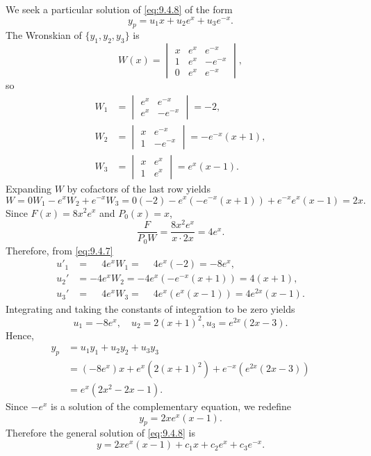 \begin{solution}
We seek a particular solution of \eqref{eq:9.4.8} of the form
\[
y_p=u_1x+u_2e^x+u_3e^{-x}.
\]
The Wronskian of  $\{y_1,y_2,y_3\}$ is
\[
W(x)=\begin{vmatrix}
x&e^x&e^{-x} \\ 1&e^x&-e^{-x} \\ 0&e^x&e^{-x}
\end{vmatrix},
\]
so
\begin{align*}
W_1
&=\begin{vmatrix}
e^x&e^{-x}\\ e^x&-e^{-x}
\end{vmatrix}=-2,\\
W_2
&=\begin{vmatrix}
x&e^{-x}\\1&-e^{-x}
\end{vmatrix}=-e^{-x}(x+1),\\
W_3
&=\begin{vmatrix}
x&e^x\\1&e^x
\end{vmatrix}=e^x(x-1).
\end{align*}
Expanding $W$ by cofactors of the last row yields
\[
W=0W_1-e^x W_2+e^{-x}W_3=0(-2)-e^x\left(-e^{-x}(x+1)\right)
+e^{-x}e^x(x-1)=2x.
\]
 Since $F(x)=8x^2e^x$ and $P_0(x)=x$,
\[
\frac{F}{P_0W}=\frac{8x^2e^x}{x\cdot 2x}=4e^x.
\]
Therefore, from \eqref{eq:9.4.7}
\begin{align*}
u'_1&=\phantom{-} 4e^xW_1=\phantom{-}4e^x(-2)=-8e^x,\\
u_2'&=-4e^xW_2=-4e^x\left(-e^{-x}(x+1)\right)=4(x+1),\\
u_3'&=\phantom{-}4e^xW_3=\phantom{-}4e^x\left(e^x(x-1)\right)=4e^{2x}(x-1).
\end{align*}
 Integrating and taking the constants of
integration to be zero yields
\[
u_1=-8e^x,\quad u_2=2(x+1)^2, u_3=e^{2x}(2x-3).
\]
Hence,
\begin{align*}
y_p&=u_1y_1+u_2y_2+u_3y_3\\
&=(-8e^x)x+e^x(2(x+1)^2)+e^{-x}\left(e^{2x}(2x-3)\right)\\
&=e^x(2x^2-2x-1).
\end{align*}
Since $-e^x$ is a solution of the complementary equation, we redefine
\[
y_p=2xe^x(x-1).
\]
 Therefore the general solution of \eqref{eq:9.4.8} is
\[
y=2xe^x(x-1)+c_1x+c_2e^x+c_3e^{-x}.
\]
\end{solution}



